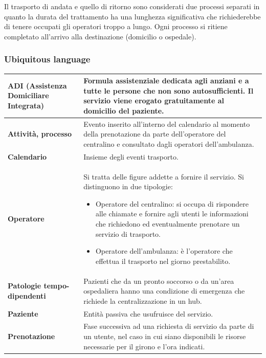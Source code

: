 \documentclass[12pt]{article}
\begin{document}
Il trasporto di andata e quello di ritorno sono considerati due processi separati in quanto la durata del trattamento ha una lunghezza significativa che richiederebbe di tenere occupati gli operatori troppo a lungo.
Ogni processo si ritiene completato all'arrivo alla destinazione (domicilio o ospedale).

\subsubsection{Ubiquitous language}
\begin{tabular}{|p{4cm}|p{11cm}|}
\hline 
\textbf{ADI (Assistenza Domiciliare Integrata)} & Formula assistenziale dedicata agli anziani e a tutte le persone che non sono autosufficienti. Il servizio viene erogato gratuitamente al domicilio del paziente.\\ 

\hline 
\textbf{Attività, processo} & Evento inserito all'interno del calendario al momento della prenotazione da parte dell'operatore del centralino e consultato dagli operatori dell'ambulanza.\\

\hline
\textbf{Calendario} & Insieme degli eventi trasporto.\\

\hline 
\textbf{Operatore} & Si tratta delle figure addette a fornire il servizio. Si distinguono in due tipologie:
\begin{itemize}
    \item Operatore del centralino: si occupa di rispondere alle chiamate e fornire agli utenti le informazioni che richiedono ed eventualmente prenotare un servizio di trasporto.
    \item Operatore dell'ambulanza: è l'operatore che effettua il trasporto nel giorno prestabilito.
\end{itemize}\\ 

\hline 
\textbf{Patologie tempo-dipendenti} & Pazienti che da un pronto
soccorso o da un'area ospedaliera hanno una condizione di emergenza che richiede la centralizzazione in un hub.\\

\hline
\textbf{Paziente} & Entità passiva che usufruisce del servizio.\\

\hline
\textbf{Prenotazione} & Fase successiva ad una richiesta di servizio da parte di un utente, nel caso in cui siano disponibili le risorse necessarie per il girono e l'ora indicati.\\


\end{tabular}
\end{document}

